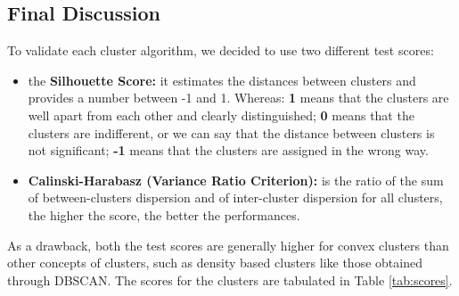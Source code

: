 \documentclass[a4paper,11pt,dvipsnames]{article}
\begin{document}
\subsection{Final Discussion}

To validate each cluster algorithm, we decided to use two different test scores:
\begin{itemize}
    \item the \textbf{Silhouette Score:} it estimates the distances between clusters and provides a number between -1 and 1. Whereas: \textbf{1} means that the clusters are well apart from each other and clearly distinguished; \textbf{0} means that the clusters are indifferent, or we can say that the distance between clusters is not significant; \textbf{-1} means that the clusters are assigned in the wrong way.
    \item \textbf{Calinski-Harabasz (Variance Ratio Criterion):} is the ratio of the sum of between-clusters dispersion and of inter-cluster dispersion for all clusters, the higher the score, the better the performances.
\end{itemize}

As a drawback, both the test scores are generally higher for convex clusters than other concepts of clusters, such as density based clusters like those obtained through DBSCAN. The scores for the clusters are tabulated in Table \ref{tab:scores}.

\begin{table}[h]
    \centering
    \caption{Evaluation of different test scores for the type of analyzed cluster algorithms}
    \label{tab:scores}
\end{table}
\end{document}
